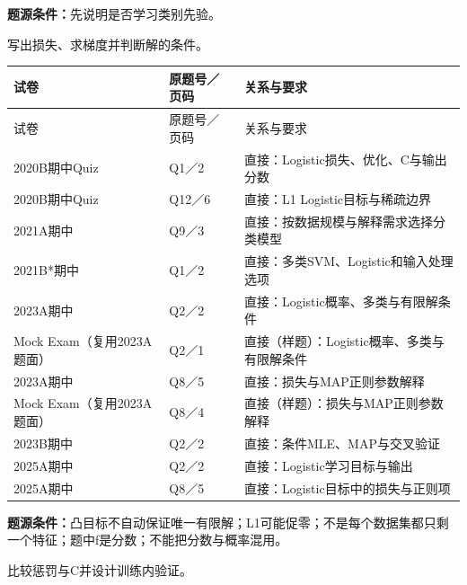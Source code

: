 \textbf{题源条件：}先说明是否学习类别先验。



写出损失、求梯度并判断解的条件。

\begingroup\small\setlength{\tabcolsep}{3pt}\renewcommand{\arraystretch}{1.22}
\begin{longtable}{@{}>{\raggedright\arraybackslash}p{}>{\raggedright\arraybackslash}p{}>{\raggedright\arraybackslash}p{}@{}}
\toprule
试卷 & 原题号／页码 & 关系与要求 \\
\midrule\endfirsthead
试卷 & 原题号／页码 & 关系与要求 \\
\midrule\endhead
\bottomrule\endfoot
2020B期中Quiz & Q1／2 & 直接：Logistic损失、优化、C与输出分数 \\
2020B期中Quiz & Q12／6 & 直接：L1 Logistic目标与稀疏边界 \\
2021A期中 & Q9／3 & 直接：按数据规模与解释需求选择分类模型 \\
2021B*期中 & Q1／2 & 直接：多类SVM、Logistic和输入处理选项 \\
2023A期中 & Q2／2 & 直接：Logistic概率、多类与有限解条件 \\
Mock Exam（复用2023A题面） & Q2／1 & 直接（样题）：Logistic概率、多类与有限解条件 \\
2023A期中 & Q8／5 & 直接：损失与MAP正则参数解释 \\
Mock Exam（复用2023A题面） & Q8／4 & 直接（样题）：损失与MAP正则参数解释 \\
2023B期中 & Q2／2 & 直接：条件MLE、MAP与交叉验证 \\
2025A期中 & Q2／2 & 直接：Logistic学习目标与输出 \\
2025A期中 & Q8／5 & 直接：Logistic目标中的损失与正则项 \\
\end{longtable}\endgroup

\textbf{题源条件：}凸目标不自动保证唯一有限解；L1可能促零；不是每个数据集都只剩一个特征；题中f是分数；不能把分数与概率混用。



比较惩罚与C并设计训练内验证。

